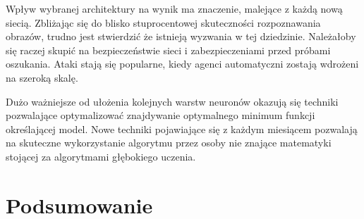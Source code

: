 \documentclass[12pt,a4paper,twoside,titlepage,openright]{book}
\begin{document}
Wpływ wybranej architektury na wynik ma znaczenie, malejące z każdą nową siecią. Zbliżając się do blisko stuprocentowej skuteczności rozpoznawania obrazów, trudno jest stwierdzić że istnieją wyzwania w tej dziedzinie. Należałoby się raczej skupić na bezpieczeństwie sieci i zabezpieczeniami przed próbami oszukania. Ataki stają się popularne, kiedy agenci automatyczni zostają wdrożeni na szeroką skalę.

Dużo ważniejsze od ułożenia kolejnych warstw neuronów okazują się techniki pozwalające optymalizować znajdywanie optymalnego minimum funkcji określającej model. Nowe techniki pojawiające się z każdym miesiącem pozwalają na skuteczne wykorzystanie algorytmu przez osoby nie znające matematyki stojącej za algorytmami głębokiego uczenia.


\chapter*{Podsumowanie}


\listoffigures


\printbibliography
\end{document}
